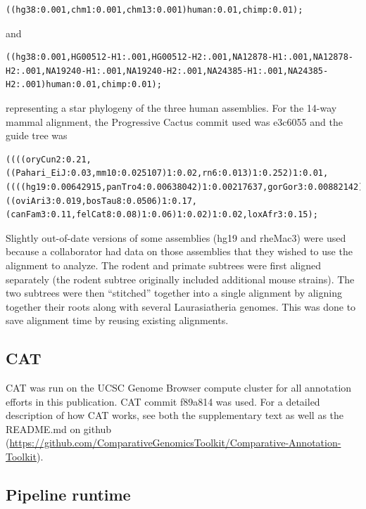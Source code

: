 \documentclass[fleqn,10pt]{wlscirep}
\begin{document}
\begin{lstlisting}
((hg38:0.001,chm1:0.001,chm13:0.001)human:0.01,chimp:0.01);
\end{lstlisting}

and

\begin{lstlisting}
((hg38:0.001,HG00512-H1:.001,HG00512-H2:.001,NA12878-H1:.001,NA12878-H2:.001,NA19240-H1:.001,NA19240-H2:.001,NA24385-H1:.001,NA24385-H2:.001)human:0.01,chimp:0.01);
\end{lstlisting}
  
representing a star phylogeny of the three human assemblies. For the 14-way mammal alignment, the Progressive Cactus commit used was e3c6055 and the guide tree was 
  
\begin{lstlisting}
((((oryCun2:0.21,((Pahari_EiJ:0.03,mm10:0.025107)1:0.02,rn6:0.013)1:0.252)1:0.01,((((hg19:0.00642915,panTro4:0.00638042)1:0.00217637,gorGor3:0.00882142)1:0.00935116,ponAbe2:0.0185056)1:0.00440069,rheMac3:0.007)1:0.1)1:0.02,((oviAri3:0.019,bosTau8:0.0506)1:0.17,(canFam3:0.11,felCat8:0.08)1:0.06)1:0.02)1:0.02,loxAfr3:0.15);
\end{lstlisting}

Slightly out-of-date versions of some assemblies (hg19 and rheMac3) were used because a collaborator had data on those assemblies that they wished to use the alignment to analyze. The rodent and primate subtrees were first aligned separately (the rodent subtree originally included additional mouse strains)\cite{thybert2018repeat,lilue2018multiple}. The two subtrees were then “stitched” together into a single alignment by aligning together their roots along with several Laurasiatheria genomes. This was done to save alignment time by reusing existing alignments.

\subsection*{CAT}

CAT was run on the UCSC Genome Browser compute cluster for all annotation efforts in this publication. CAT commit f89a814 was used. For a detailed description of how CAT works, see both the supplementary text as well as the README.md on github (\url{https://github.com/ComparativeGenomicsToolkit/Comparative-Annotation-Toolkit}). 

\subsection*{Pipeline runtime}
\end{document}
